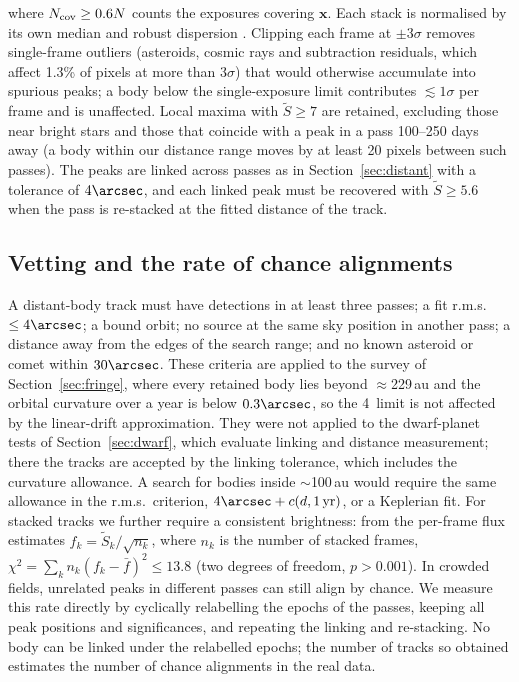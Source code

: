 \documentclass[twocolumn,linenumbers]{aastex702}
\begin{document}
where $N_{\rm cov} \ge 0.6N$ counts the exposures covering $\mathbf{x}$. Each stack is normalised by its own median and robust dispersion \citep[median absolute deviation;][]{rousseeuw93}. Clipping each frame at $\pm 3\sigma$ removes single-frame outliers (asteroids, cosmic rays and subtraction residuals, which affect 1.3\% of pixels at more than $3\sigma$) that would otherwise accumulate into spurious peaks; a body below the single-exposure limit contributes $\lesssim 1\sigma$ per frame and is unaffected. Local maxima with $\widetilde{S} \ge 7$ are retained, excluding those near bright stars and those that coincide with a peak in a pass 100--250 days away (a body within our distance range moves by at least 20 pixels between such passes). The peaks are linked across passes as in Section~\ref{sec:distant} with a tolerance of $4\arcsec$, and each linked peak must be recovered with $\widetilde{S} \ge 5.6$ when the pass is re-stacked at the fitted distance of the track.

\subsection{Vetting and the rate of chance alignments}\label{sec:vet}
A distant-body track must have detections in at least three passes; a fit r.m.s.\ $\le 4\arcsec$; a bound orbit; no source at the same sky position in another pass; a distance away from the edges of the search range; and no known asteroid or comet within $30\arcsec$. These criteria are applied to the survey of Section~\ref{sec:fringe}, where every retained body lies beyond $\approx$229\,au and the orbital curvature over a year is below $0.3\arcsec$, so the 4\arcsec\ limit is not affected by the linear-drift approximation. They were not applied to the dwarf-planet tests of Section~\ref{sec:dwarf}, which evaluate linking and distance measurement; there the tracks are accepted by the linking tolerance, which includes the curvature allowance. A search for bodies inside $\sim$100\,au would require the same allowance in the r.m.s.\ criterion, $4\arcsec + c(d, 1\,\mathrm{yr})$, or a Keplerian fit. For stacked tracks we further require a consistent brightness: from the per-frame flux estimates $f_k = \widetilde{S}_k/\sqrt{n_k}$, where $n_k$ is the number of stacked frames, $\chi^2 = \sum_k n_k (f_k - \bar{f})^2 \le 13.8$ (two degrees of freedom, $p > 0.001$). In crowded fields, unrelated peaks in different passes can still align by chance. We measure this rate directly by cyclically relabelling the epochs of the passes, keeping all peak positions and significances, and repeating the linking and re-stacking. No body can be linked under the relabelled epochs; the number of tracks so obtained estimates the number of chance alignments in the real data.
\end{document}
